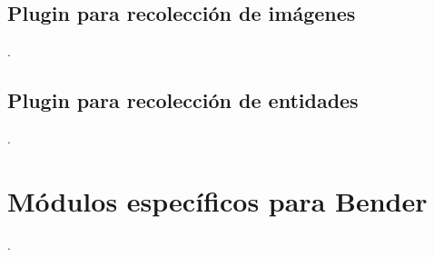 \subsection{Plugin para recolección de imágenes}

\lstset{style=/Style/ROS/MSG}


.


\subsection{Plugin para recolección de entidades}

.



\section{Módulos específicos para Bender}

.


